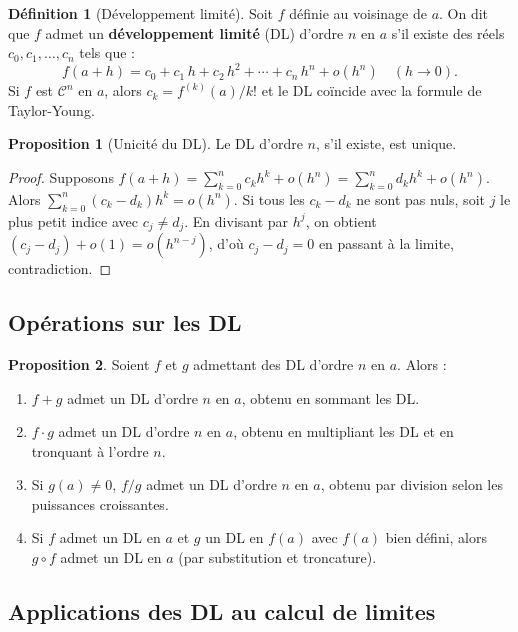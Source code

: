 \documentclass[12pt,a4paper,openany]{book}
\theoremstyle{definition}
\newtheorem{definition}{Définition}[chapter]
\newtheorem{proposition}{Proposition}[chapter]
\begin{document}
\begin{definition}[Développement limité]\label{def:DL}
Soit $f$ définie au voisinage de $a$. On dit que $f$ admet un \textbf{développement limité} (DL) d'ordre $n$ en $a$ s'il existe des réels $c_0, c_1, \ldots, c_n$ tels que :
\[
  f(a + h) = c_0 + c_1\,h + c_2\,h^2 + \cdots + c_n\,h^n + o(h^n) \quad (h \to 0).
\]
Si $f$ est $\mathcal{C}^n$ en $a$, alors $c_k = f^{(k)}(a)/k!$ et le DL coïncide avec la formule de Taylor-Young.
\end{definition}

\begin{proposition}[Unicité du DL]\label{prop:unicite-DL}
Le DL d'ordre $n$, s'il existe, est unique.
\end{proposition}

\begin{proof}
Supposons $f(a+h) = \sum_{k=0}^n c_k h^k + o(h^n) = \sum_{k=0}^n d_k h^k + o(h^n)$. Alors $\sum_{k=0}^n (c_k - d_k)h^k = o(h^n)$. Si tous les $c_k - d_k$ ne sont pas nuls, soit $j$ le plus petit indice avec $c_j \neq d_j$. En divisant par $h^j$, on obtient $(c_j - d_j) + o(1) = o(h^{n-j})$, d'où $c_j - d_j = 0$ en passant à la limite, contradiction.
\end{proof}

\subsection{Opérations sur les DL}

\begin{proposition}\label{prop:operations-DL}
Soient $f$ et $g$ admettant des DL d'ordre $n$ en $a$. Alors :
\begin{enumerate}[label=\textup{(\roman*)}]
  \item $f + g$ admet un DL d'ordre $n$ en $a$, obtenu en sommant les DL.
  \item $f \cdot g$ admet un DL d'ordre $n$ en $a$, obtenu en multipliant les DL et en tronquant à l'ordre $n$.
  \item Si $g(a) \neq 0$, $f/g$ admet un DL d'ordre $n$ en $a$, obtenu par division selon les puissances croissantes.
  \item Si $f$ admet un DL en $a$ et $g$ un DL en $f(a)$ avec $f(a)$ bien défini, alors $g \circ f$ admet un DL en $a$ (par substitution et troncature).
\end{enumerate}
\end{proposition}

\subsection{Applications des DL au calcul de limites}
\end{document}
